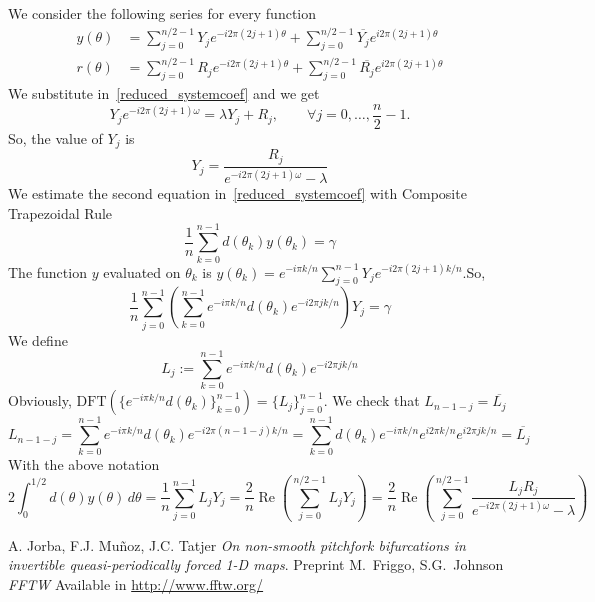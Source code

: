 \documentclass{article}
\def\Re{\mathop{\mathrm{Re}}}
\begin{document}
We consider the following series for every function
\begin{align}
y(\theta)& = \sum^{n/2-1}_{j=0} Y_j e^{-i2\pi(2j+1) \theta} +
\sum^{n/2-1}_{j=0}\overline{Y_{j}} e^{i2\pi(2j+1) \theta} \\
r(\theta)& = \sum^{n/2-1}_{j=0} R_j e^{-i2\pi(2j+1) \theta} +
\sum^{n/2-1}_{j=0}\overline{R_j} e^{i2\pi(2j+1) \theta} 
\end{align}
We substitute in~\eqref{reduced_systemcoef} and we get 
\begin{equation}
Y_j e^{-i2\pi(2j+1) \omega}= \lambda Y_j+R_j, \qquad \forall j=0,\ldots,\frac n 2 -1.
\end{equation}
So, the value of $Y_j$ is 
\begin{equation} \label{value_Yjcoef}
Y_j=\frac{R_j}{e^{-i2\pi(2j+1)\omega}-\lambda}
\end{equation} 
We estimate the second equation in~\eqref{reduced_systemcoef} with  Composite Trapezoidal Rule
\begin{equation}
\frac 1 n \sum^{n-1}_{k=0} 
d(\theta_k) y(\theta_k) = \gamma
\end{equation}
The function $y$ evaluated on $\theta_k$ is 
$y(\theta_k)=e^{-i\pi k/n}\sum_{j=0}^{n-1} Y_j e^{-i2\pi(2j+1)k/n}$.So, 
\begin{equation}
\frac 1 n 
\sum_{j=0}^{n-1} \left ( 
\sum_{k=0}^{n-1}  e^{-i\pi k/n} d(\theta_k)  e^{-i2\pi j k /n} 
\right ) Y_j=\gamma 
\end{equation}
We define 
\begin{equation}
L_j:= \sum_{k=0}^{n-1}  e^{-i\pi k/n} d(\theta_k) e^{-i2\pi j k /n} 
\end{equation}
Obviously, $\mbox{DFT}(\{ e^{-i\pi k/n} d(\theta_k) \}_{k=0}^{n-1} )=\{L_j\}_{j=0}^{n-1}$. 
We check that $L_{n-1-j}=\overline{L_j}$
\begin{equation}
L_{n-1-j}=\sum_{k=0}^{n-1} e^{-i\pi k /n} d(\theta_k) e^{-i2\pi(n-1-j)k/n}=
\sum_{k=0}^{n-1}d(\theta_k) e^{-i\pi k /n} e^{i2\pi k /n} e^{i2\pi jk/n}=\overline{L_j}
\end{equation}
With the above notation 
$$
2 \int^{1/2}_0 d(\theta) y(\theta) \, d\theta=\frac 1 n \sum_{j=0}^{n-1} L_jY_j = \frac 2 n \Re(\sum_{j=0}^{n/2-1} L_jY_j)= \frac 2 n \Re \left ( \displaystyle\sum_{j=0}^{n/2-1} \frac{L_j R_j}{e^{-i2\pi (2j+1)\omega}-\lambda}\right )
$$


\begin{thebibliography}{99}
 A. Jorba, F.J. Mu\~noz, J.C. Tatjer \emph{On
    non-smooth pitchfork bifurcations in invertible
    queasi-periodically forced 1-D maps}. Preprint 
 M.~Friggo, S.G.~Johnson  \emph{FFTW}  Available in \url{http://www.fftw.org/}
\end{thebibliography}
\end{document}
